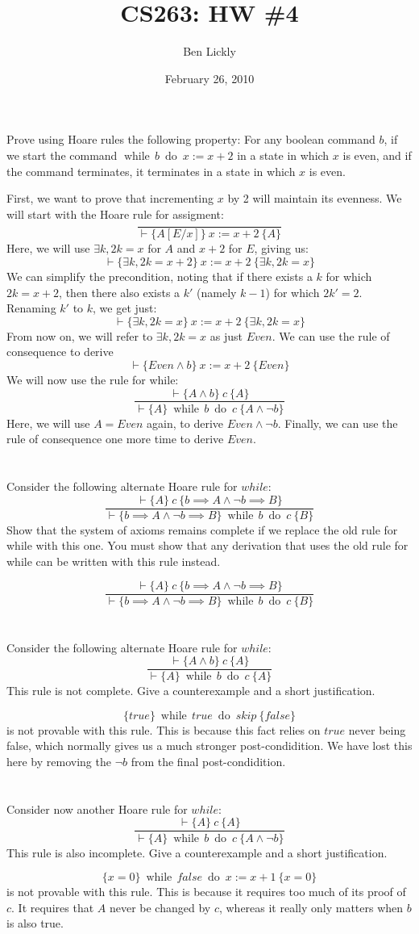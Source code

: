 \documentclass{article}
\title{CS263: HW \#4}
\author{Ben Lickly}
\date{February 26, 2010}
\newcommand{\problem}[1]
{\subsubsection*{} %
\vspace{-16pt} \section{} \vspace{-22pt} \qquad
#1%
\bigskip \bigskip
}
\newcommand{\while}[2]{\operatorname{while}\, #1\ \operatorname{do}\ #2}
\newcommand{\proves}{\vdash}
\newcommand{\axiomatic}[3]{\{#1\}\ #2\ \{#3\}}
\begin{document}
\maketitle

\problem{
Prove using Hoare rules the following property: For any boolean
command $b$, if we start the command $\while{b}{x := x + 2}$ in a state in
which $x$ is even, and if the command terminates, it terminates in a state in
which $x$ is even.
}
First, we want to prove that incrementing $x$ by 2 will maintain its evenness.
We will start with the Hoare rule for assigment:
\[
\frac{ }
{\proves \axiomatic{A[E/x]}{x := x + 2}{A}}
\]
Here, we will use $\exists k, 2k = x$ for $A$
and $x+2$ for $E$, giving us:
\[
\proves \axiomatic{\exists k, 2k = x + 2}{x := x + 2}{\exists k, 2k = x}
\]
We can simplify the precondition, noting that if there exists a $k$ for which
$2k = x +2$, then there also exists a $k'$ (namely $k-1$) for which $2k' = 2$.
Renaming $k'$ to $k$, we get just:
\[
\proves \axiomatic{\exists k, 2k = x}{x := x + 2}{\exists k, 2k = x}
\]
From now on, we will refer to $\exists k, 2k = x$ as just $Even$.
We can use the rule of consequence to derive
\[
\proves \axiomatic{Even \wedge b}{x := x + 2}{Even}
\]
We will now use the rule for while:
\[
\frac{\proves \axiomatic{A \wedge b}{c}{A}}
{\proves \axiomatic{A}{\while{b}{c}}{A \wedge \neg b}}
\]
Here, we will use $A = Even$ again, to derive $Even \wedge \neg b$.
Finally, we can use the rule of consequence one more time to derive $Even$.

\problem{Consider the following alternate Hoare rule for $while$:
\[
\frac{\proves \axiomatic{A}{c}{b \implies A \wedge \neg b \implies B}}
{\proves \axiomatic{b \implies A \wedge \neg b \implies B}{\while{b}{c}}{B}}
\]
Show that the system of axioms remains complete if we replace the old
rule for while with this one. You must show that any derivation that uses
the old rule for while can be written with this rule instead.
}

\[
\frac{\proves \axiomatic{A}{c}{b \implies A \wedge \neg b \implies B}}
{\proves \axiomatic{b \implies A \wedge \neg b \implies B}{\while{b}{c}}{B}}
\]


\problem{Consider the following alternate Hoare rule for $while$:
\[
\frac{\proves \axiomatic{A \wedge b}{c}{A}}
{\proves \axiomatic{A}{\while{b}{c}}{A}}
\]
This rule is not complete. Give a counterexample and a short justification.
}

\[\axiomatic{true}{\while{true}{skip}}{false}\] is not provable with this rule. 
This is because this fact relies on $true$ never being false, which normally
gives us a much stronger post-condidition.  We have lost this here by removing
the $\neg b$ from the final post-condidition.

\problem{Consider now another Hoare rule for $while$:
\[
\frac{\proves \axiomatic{A}{c}{A}}
{\proves \axiomatic{A}{\while{b}{c}}{A \wedge \neg b}}
\]
This rule is also incomplete. Give a counterexample and a short justification.
}

\[\axiomatic{x=0}{\while{false}{x:=x+1}}{x=0}\] is not provable with this rule.
This is because it requires too much of its proof of $c$.  It requires that 
$A$ never be changed by $c$, whereas it really only matters when $b$ is also
true.
\end{document}

